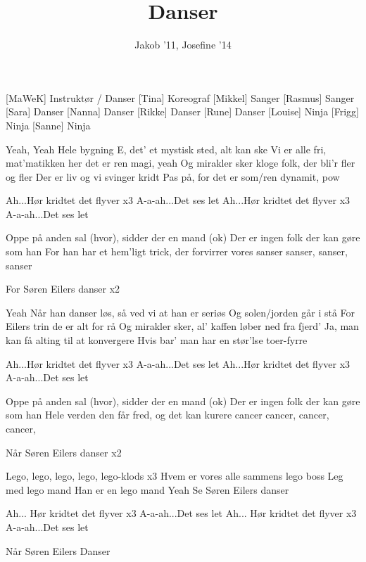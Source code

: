 \documentclass[a4paper,11pt]{article}
\title{Danser}
\author{Jakob '11, Josefine '14}
\begin{document}
\maketitle

\begin{roles}
[MaWeK] Instruktør / Danser
[Tina] Koreograf
[Mikkel] Sanger
[Rasmus] Sanger
[Sara] Danser
[Nanna] Danser
[Rikke] Danser
[Rune] Danser
[Louise] Ninja
[Frigg] Ninja
[Sanne] Ninja
\end{roles}

\begin{props}
\end{props}

\begin{song}
 Yeah, Yeah
Hele bygning E, 
det' et mystisk sted, alt kan ske
Vi er alle fri, 
mat'matikken her det er ren magi, yeah
Og mirakler sker
kloge folk, der bli'r fler og fler
Der er liv og vi svinger kridt
Pas på, for det er som/ren dynamit, pow

 Ah...Hør kridtet det flyver x3 
A-a-ah...Det ses let
Ah...Hør kridtet det flyver x3
A-a-ah...Det ses let

 Oppe på anden sal (hvor), sidder der en mand (ok)
Der er ingen folk der kan gøre som han
For han har et hem'ligt trick, der forvirrer vores sanser
sanser, sanser, sanser

 For Søren Eilers danser x2

 Yeah
Når han danser løs,
så ved vi at han er seriøs
Og solen/jorden går i stå
For Eilers trin de er alt for rå
Og mirakler sker,
al' kaffen løber ned fra fjerd'
Ja, man kan få alting til at konvergere
Hvis bar' man har en stør'lse toer-fyrre

 Ah...Hør kridtet det flyver x3
A-a-ah...Det ses let
Ah...Hør kridtet det flyver x3
A-a-ah...Det ses let

 Oppe på anden sal (hvor), sidder der en mand (ok)
Der er ingen folk der kan gøre som han
Hele verden den får fred, og det kan kurere cancer
cancer, cancer, cancer,

 Når Søren Eilers danser x2


 Lego, lego, lego, lego, lego-klods x3
Hvem er vores alle sammens lego boss
Leg med lego mand
Han er en lego mand
Yeah
Se Søren Eilers danser

 Ah... Hør kridtet det flyver x3
A-a-ah...Det ses let
Ah...  Hør kridtet det flyver x3
A-a-ah...Det ses let %

 Når Søren Eilers Danser

\end{song}
\end{document}
